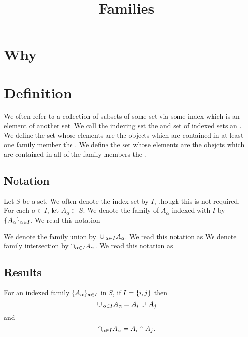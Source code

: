 






\title{Families}

\section{Why}



\section{Definition}

We often refer to a collection of subsets of some set via some index which is an element of another set.
We call the indexing set the  and set of indexed sets an .
We define the set whose elements are the objects which are contained in at least one family member the .
We define the set whose elements are the obejcts which are contained in all of the family members the .

\subsection{Notation}

Let $S$ be a set.
We often denote the index set by $I$, though this is not required.
For each $\alpha \in I$, let $A_{\alpha} \subset S$.
We denote the family of $A_{\alpha}$ indexed with $I$ by $\{A_{\alpha}\}_{\alpha \in I}$.
We read this notation 

We denote the family union by $\,\cup\,_{\alpha \in I} A_{\alpha}$.
We read this notation as 
We denote family intersection by $\cap_{\alpha \in I} A_{\alpha}$.
We read this notation as 

\subsection{Results}

\begin{prop}
  For an indexed family $\{A_{\alpha}\}_{\alpha \in I}$ in $S$, if $I = \{i, j\}$ then
  \[
    \,\cup\,_{\alpha \in I} A_{\alpha} = A_i \,\cup\, A_j
  \]
  and
  \[
    \cap_{\alpha \in I} A_{\alpha} = A_i \cap A_j.
  \]
\end{prop}

